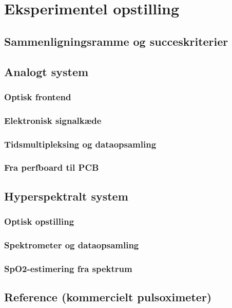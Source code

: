 \chapter{Eksperimentel opstilling}

\section{Sammenligningsramme og succeskriterier}

\section{Analogt system}
\subsection{Optisk frontend}
\subsection{Elektronisk signalkæde}
\subsection{Tidsmultipleksing og dataopsamling}
\subsection{Fra perfboard til PCB}

\section{Hyperspektralt system}
\subsection{Optisk opstilling}
\subsection{Spektrometer og dataopsamling}
\subsection{SpO2-estimering fra spektrum}

\section{Reference (kommercielt pulsoximeter)}





